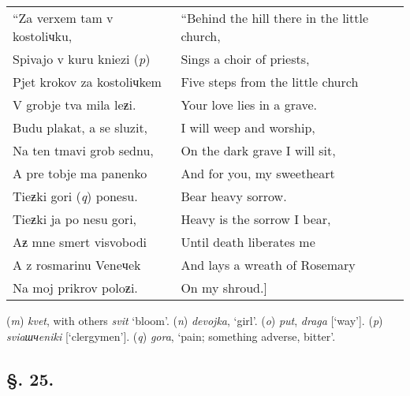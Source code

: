 \begin{small}
\begin{longtable}{ l l }
    “Za verxem tam v kostoliчku, & “Behind the hill there in the little church, \\
    \hspace*{0.5cm}Spivajo v kuru kniezi (\textit{p}) & \hspace*{0.5cm}Sings a choir of priests, \\
    Pjet krokov za kostoliчkem & Five steps from the little church \\
    \hspace*{0.5cm}V grobje tva mila leƶi. & \hspace*{0.5cm}Your love lies in a grave. \\
    Budu plakat, a se sluzit, & I will weep and worship, \\
    \hspace*{0.5cm}Na ten tmavi grob sednu, & \hspace*{0.5cm}On the dark grave I will sit, \\
    A pre tobje ma panenko & And for you, my sweetheart \\
    \hspace*{0.5cm}Tieƶki gori (\textit{q}) ponesu. & \hspace*{0.5cm}Bear heavy sorrow. \\
    Tieƶki ja po nesu gori, & Heavy is the sorrow I bear, \\
    \hspace*{0.5cm}Aƶ mne smert visvobodi & \hspace*{0.5cm}Until death liberates me \\
    A z rosmarinu Veneчek & And lays a wreath of Rosemary \\
    \hspace*{0.5cm}Na moj prikrov poloƶi. & \hspace*{0.5cm}On my shroud.] \\
\end{longtable}
\end{small}

(\textit{m}) \textit{kvet}, with others \textit{svit} ‘bloom’. (\textit{n}) \textit{devojka}, ‘girl’. (\textit{o}) \textit{put}, \textit{draga} [‘way’]. (\textit{p}) \textit{sviaшчeniki} [‘clergymen’]. (\textit{q}) \textit{gora}, ‘pain; something adverse, bitter’.

\subsection*{\hspace*{\fill}§. 25.\hspace*{\fill}}


